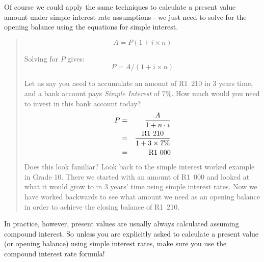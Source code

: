 Of course we could apply the same techniques to calculate a present value amount under simple interest rate assumptions - we just need to solve for the opening balance using the equations for simple interest.
\begin{quote}
{\begin{equation}
A = P (1 + i\times n)
\end{equation}

Solving for $P$ gives:
\begin{equation}
P = A / (1 + i\times n)
\end{equation}

Let us say you need to accumulate an amount of R1~210 in 3 years time, and a bank account pays \textit{Simple Interest} of 7\%. How much would you need to invest in this bank account today?
\begin{eqnarray*}
P &=& \frac{A}{1 + n\cdot i}\\
&=& \frac{\rm{R}1~210}{ 1 + 3 \times 7\%}\\
&=& \rm{R}1~000
\end{eqnarray*}
Does this look familiar? Look back to the simple interest worked example in Grade 10. There we started with an amount of R1~000 and looked at what it would grow to in 3 years' time using simple interest rates. Now we have worked backwards to see what amount we need as an opening balance in order to achieve the closing balance of R1~210.}
\end{quote}

In practice, however, present values are usually always calculated assuming compound interest. So unless you are explicitly asked to calculate a present value (or opening balance) using simple interest rates, make sure you use the compound interest rate formula!


